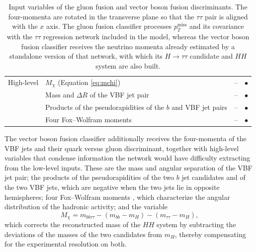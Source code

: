 \begin{table}[tbp]
\begin{tabular}{@{}ll>{\centering\arraybackslash}p{1.1cm}>{\centering\arraybackslash}p{1.1cm}@{}}
\midrule
High-level        & $M_\chi$ (Equation \ref{eq:mchi})                            & --        & $\bullet$ \\
                  & Mass and $\Delta R$ of the VBF jet pair                      & --        & $\bullet$ \\
                  & Products of the pseudorapidities of the $b$ and VBF jet pairs & --       & $\bullet$ \\
                  & Four Fox--Wolfram moments                                    & --        & $\bullet$ \\
\bottomrule
\end{tabular}
\caption[Input variables of the signal-extraction discriminants]{%
    Input variables of the gluon fusion and vector boson fusion discriminants. The
    four-momenta are rotated in the transverse plane so that the $\tau\tau$ pair is aligned
    with the $x$ axis. The gluon fusion classifier processes $p_T^\text{miss}$ and its
    covariance with the $\tau\tau$ regression network included in the model, whereas the
    vector boson fusion classifier receives the neutrino momenta already estimated by a
    standalone version of that network, with which its $H\to\tau\tau$ candidate and $HH$
    system are also built.}
\label{tab:dnn_inputs}
\end{table}


The vector boson fusion classifier additionally receives the four-momenta of the VBF jets and their quark versus gluon discriminant, together with high-level variables that condense information the network would have difficulty extracting from the low-level inputs. These are the mass and angular separation of the VBF jet pair; the products of the pseudorapidities of the two $b$ jet candidates and of the two VBF jets, which are negative when the two jets lie in opposite hemispheres; four Fox--Wolfram moments \cite{FoxWolfram}, which characterize the angular distribution of the hadronic activity; and the variable
%
\begin{equation}
    M_{\chi} = m_{bb\tau\tau} - \left(m_{bb} - m_H\right) - \left(m_{\tau\tau} - m_H\right),
    \label{eq:mchi}
\end{equation}
%
which corrects the reconstructed mass of the $HH$ system by subtracting the deviations of the masses of the two candidates from $m_H$, thereby compensating for the experimental resolution on both.

